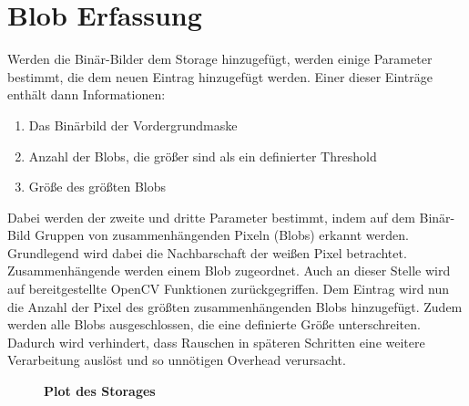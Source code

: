 \section{Blob Erfassung}
\label{sec:blob}
%

Werden die Binär-Bilder dem Storage hinzugefügt, werden einige Parameter bestimmt, die dem neuen Eintrag hinzugefügt werden.
Einer dieser Einträge enthält dann Informationen:
\begin{enumerate}
	\item Das Binärbild der Vordergrundmaske
	\item Anzahl der Blobs, die größer sind als ein definierter Threshold
	\item Größe des größten Blobs
\end{enumerate}
Dabei werden der zweite und dritte Parameter bestimmt, indem auf dem Binär-Bild Gruppen von zusammenhängenden Pixeln (Blobs) erkannt werden. 
Grundlegend wird dabei die Nachbarschaft der weißen Pixel betrachtet. Zusammenhängende werden einem Blob zugeordnet. Auch an dieser Stelle wird auf bereitgestellte OpenCV Funktionen zurückgegriffen. Dem Eintrag wird nun die Anzahl der Pixel des größten zusammenhängenden Blobs hinzugefügt. Zudem werden alle Blobs ausgeschlossen, die eine definierte Größe unterschreiten. Dadurch wird verhindert, dass Rauschen in späteren Schritten eine weitere Verarbeitung auslöst und so unnötigen Overhead verursacht.
\begin{figure}[ht]
\centering
{}\qquad
\caption{\textbf{Plot des Storages}}
\label{Fig:blobplot}
\end{figure}

